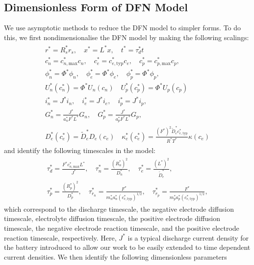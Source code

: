 \documentclass[preprint]{elsarticle}
\begin{document}
\subsection{Dimensionless Form of DFN Model}
We use asymptotic methods to reduce the DFN model to simpler forms. To do this, we first nondimensionalise the DFN model by making the following scalings: 
\begin{gather}	
	\begin{split}
	r^* = R_s^* r_s, \quad x^* = L^* x, \quad t^* = \tau_d^* t \\ 
    c_n^* = c_{n,\text{max}}^*c_n, \quad c_e^* = c_{e,\text{typ}}^* c_e, \quad c_p^* = c_{p,\text{max}}^* c_p, \\
    \phi_n^* = \Phi^* \phi_n, \quad \phi_e^* = \Phi^* \phi_e, \quad \phi_p^*=\Phi^* \phi_p, \\ 
    U_n^*(c_n^*) = \Phi^* U_n(c_n) \quad U_p^*(c_p^*) = \Phi^* U_p(c_p) \\
    i_n^*= J^* i_n, \quad i_e^* = J^* i_e, \quad i_p^* = J^* i_p, \\ 
    G_n^* = \frac{J^*}{a_n^* F^* L^*}G_n, \quad G_p^* = \frac{J^*}{a_p^* F^* L^*}G_p, \\ 
    D_e^*(c_e^*) = \tilde{D}_e^* D_e(c_e) \quad 
    \kappa^*_e(c_e^*) = \frac{(F^*)^2 \tilde{D}_e^* c_{e,\text{typ}}^*}{R^*T^*}\kappa(c_e)
    \end{split}
\end{gather} 
and identify the following timescales in the model: 
\begin{gather} 
	\begin{split}
	\tau_d^*=\frac{F^* c_{n,\text{max}}^* L^*}{J^*},\quad \tau_n^* = \frac{(R_n^*)^2}{D_n^*}, \quad \tau_e^* = \frac{(L^*)^2}{\tilde{D}_e^*}, \\ \tau_p^* = \frac{(R_p^*)^2}{D_p^*}, \quad \tau_{r_n}^* = \frac{F^*}{m_n^* a_n^* (c_{e,\text{typ}}^*)^{1/2}}, \quad \tau_{r_p}^* = \frac{F^*}{m_p^* a_p^* (c_{e,\text{typ}}^*)^{1/2}},
    \end{split}
\end{gather} 
which correspond to the discharge timescale, the negative electrode diffusion timescale, electrolyte diffusion timescale, the positive electrode diffusion timescale, the negative electrode reaction timescale, and the positive electrode reaction timescale, respectively. Here, $J^*$ is a typical discharge current density for the battery introduced to allow our work to be easily extended to time dependent current densities. We then identify the following dimensionless parameters
\end{document}
